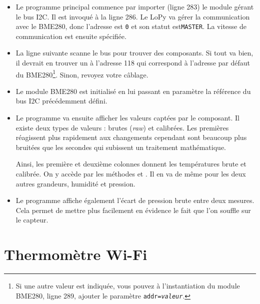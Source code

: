 \begin{itemize}

\item Le programme principal commence par importer (ligne 283) le module gérant le bus I2C. Il est invoqué à la ligne 286. Le LoPy va gérer la communication avec le BME280, donc l’adresse est \texttt{0} et son statut est\texttt{MASTER}. La vitesse de communication est ensuite spécifiée.

\item La ligne suivante scanne le bus pour trouver des composants. Si tout va bien, il devrait en trouver un à l’adresse 118 qui correspond à l’adresse par défaut du BME280\footnote{Si une autre valeur est indiquée, vous pouvez à l'instantiation du module BME280, ligne 289, ajouter le paramètre \texttt{addr=\textit{valeur}}. }. Sinon, revoyez votre câblage.

\item Le module BME280 est initialisé en lui passant en paramètre la référence du bus I2C précédemment défini.

\item Le programme va ensuite afficher les valeurs captées par le composant. Il existe deux types de valeurs : brutes (\textit{raw}) et calibrées. Les premières réagissent plus rapidement aux changements cependant sont beaucoup plus bruitées que les secondes qui subissent un traitement mathématique.

Ainsi, les première et deuxième colonnes donnent les températures brute et calibrée. On y accède par les méthodes  et . Il en va de même pour les deux autres grandeurs, humidité et pression.
\item Le programme affiche également l’écart de pression brute entre deux mesures. Cela permet de mettre plus facilement en évidence le fait que l’on souffle sur le capteur.
\end{itemize}

\section{Thermomètre Wi-Fi}

